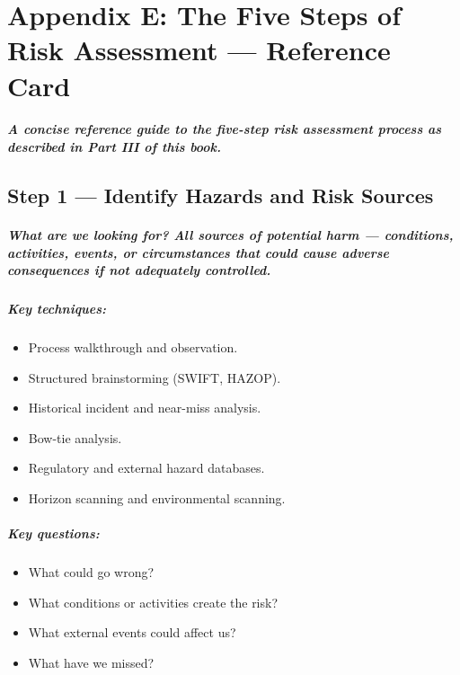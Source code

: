 \chapter*{Appendix E: The Five Steps of Risk Assessment — Reference Card}
\label{chap:Appendix E: The Five Steps of Risk Assessment — Reference Card}

\paragraph{A concise reference guide to the five-step risk assessment process as described in Part III of this book.}

\section*{Step 1 — Identify Hazards and Risk Sources}
\paragraph{\textit{What are we looking for?} All sources of potential harm — conditions, activities, events, or circumstances that could cause adverse consequences if not adequately controlled.}
\paragraph{\textit{Key techniques:}}
\begin{itemize}
  \item{Process walkthrough and observation.}
  \item{Structured brainstorming (SWIFT, HAZOP).}
  \item{Historical incident and near-miss analysis.}
  \item{Bow-tie analysis.}
  \item{Regulatory and external hazard databases.}
  \item{Horizon scanning and environmental scanning.}
\end{itemize}

\paragraph{\textit{Key questions:}}
\begin{itemize}
  \item{What could go wrong?}
  \item{What conditions or activities create the risk?}
  \item{What external events could affect us?}
  \item{What have we missed?}
\end{itemize}

